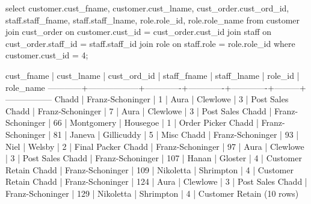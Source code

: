 \begin{enumerate}
\begin{sql}
select customer.cust_fname, customer.cust_lname, cust_order.cust_ord_id, staff.staff_fname, staff.staff_lname, role.role_id, role.role_name from customer
join cust_order on customer.cust_id = cust_order.cust_id
join staff on cust_order.staff_id = staff.staff_id
join role on staff.role = role.role_id
where customer.cust_id = 4;
\end{sql}
\begin{pseudo*}
 cust_fname |    cust_lname    | cust_ord_id | staff_fname | staff_lname | role_id |    role_name
------------+------------------+-------------+-------------+-------------+---------+-----------------
 Chadd      | Franz-Schoninger |           1 | Aura        | Clewlowe    |       3 | Post Sales 
 Chadd      | Franz-Schoninger |           7 | Aura        | Clewlowe    |       3 | Post Sales 
 Chadd      | Franz-Schoninger |          66 | Montgomery  | Housegoe    |       1 | Order Picker
 Chadd      | Franz-Schoninger |          81 | Janeva      | Gillicuddy  |       5 | Misc       
 Chadd      | Franz-Schoninger |          93 | Niel        | Welsby      |       2 | Final Packer
 Chadd      | Franz-Schoninger |          97 | Aura        | Clewlowe    |       3 | Post Sales 
 Chadd      | Franz-Schoninger |         107 | Hanan       | Gloster     |       4 | Customer Retain
 Chadd      | Franz-Schoninger |         109 | Nikoletta   | Shrimpton   |       4 | Customer Retain
 Chadd      | Franz-Schoninger |         124 | Aura        | Clewlowe    |       3 | Post Sales 
 Chadd      | Franz-Schoninger |         129 | Nikoletta   | Shrimpton   |       4 | Customer Retain
(10 rows)
\end{pseudo*}


\end{enumerate}